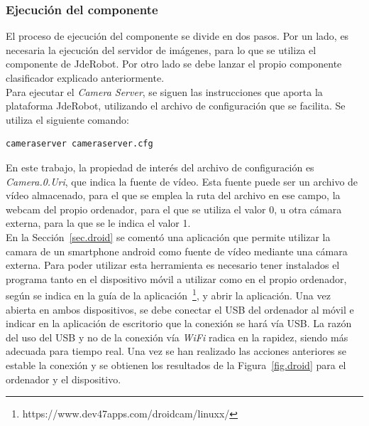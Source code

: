\subsubsection{Ejecución del componente}
El proceso de ejecución del componente se divide en dos pasos. Por un lado, es necesaria la ejecución del servidor de imágenes, para lo que se utiliza el componente de JdeRobot. Por otro lado se debe lanzar el propio componente clasificador explicado anteriormente.\\

Para ejecutar el \textit{Camera Server}, se siguen las instrucciones que aporta la plataforma JdeRobot, utilizando el archivo de configuración que se facilita. Se utiliza el siguiente comando: 
\vspace{10pt}
\begin{lstlisting}[frame=single]
	cameraserver cameraserver.cfg
\end{lstlisting}

En este trabajo, la propiedad de interés del archivo de configuración es \textit{Camera.0.Uri}, que indica la fuente de vídeo. Esta fuente puede ser un archivo de vídeo almacenado, para el que se emplea la ruta del archivo en ese campo, la webcam del propio ordenador, para el que se utiliza el valor 0, u otra cámara externa, para la que se le indica el valor 1.\\

En la Sección~\ref{sec.droid} se comentó una aplicación que permite utilizar la camara de un smartphone android como fuente de vídeo mediante una cámara externa. Para poder utilizar esta herramienta es necesario tener instalados el programa tanto en el dispositivo móvil a utilizar como en el propio ordenador, según se indica en la guía de la aplicación~\footnote{https://www.dev47apps.com/droidcam/linuxx/}, y abrir la aplicación. Una vez abierta en ambos dispositivos, se debe conectar el USB del ordenador al móvil e indicar en la aplicación de escritorio que la conexión se hará vía USB. La razón del uso del USB y no de la conexión vía \textit{WiFi} radica en la rapidez, siendo más adecuada para tiempo real. Una vez se han realizado las acciones anteriores se estable la conexión y se obtienen los resultados de la Figura~\ref{fig.droid} para el ordenador y el dispositivo.\\


